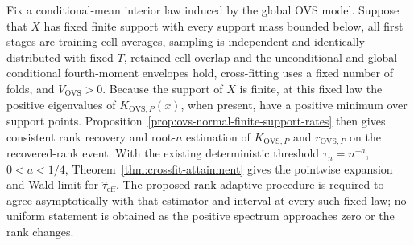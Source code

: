 Fix a conditional-mean interior law induced by the global OVS model.  Suppose that \(X\) has fixed finite support with every support mass bounded below, all first stages are training-cell averages, sampling is independent and identically distributed with fixed \(T\), retained-cell overlap and the unconditional and global conditional fourth-moment envelopes hold, cross-fitting uses a fixed number of folds, and \(V_{\mathrm{OVS}}>0\).  Because the support of \(X\) is finite, at this fixed law the positive eigenvalues of \(K_{\mathrm{OVS},P}(x)\), when present, have a positive minimum over support points.  Proposition~\ref{prop:ovs-normal-finite-support-rates} then gives consistent rank recovery and root-\(n\) estimation of \(K_{\mathrm{OVS},P}\) and \(r_{\mathrm{OVS},P}\) on the recovered-rank event.  With the existing deterministic threshold \(\tau_n=n^{-a}\), \(0<a<1/4\), Theorem~\ref{thm:crossfit-attainment} gives the pointwise expansion and Wald limit for \(\widehat\tau_{\mathrm{eff}}\).  The proposed rank-adaptive procedure is required to agree asymptotically with that estimator and interval at every such fixed law; no uniform statement is obtained as the positive spectrum approaches zero or the rank changes.
